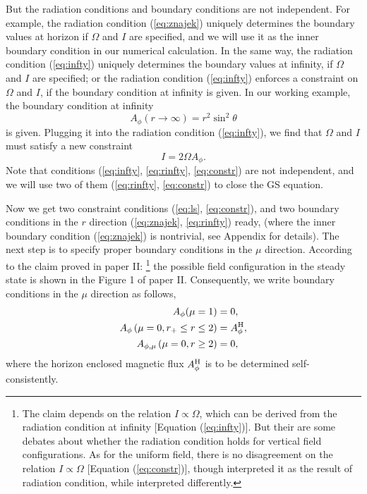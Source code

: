 \documentclass[iop,apj]{emulateapj}
\def\sst{\sin^2\theta}
\def\Am{A_{\phi,\mu}}
\def\be{\begin{equation}}
\def\ee{\end{equation}}
\def\AB{A_\phi^{\rm H}}
\begin{document}
But the radiation conditions and boundary conditions are not independent.
For example, the radiation condition (\ref{eq:znajek}) uniquely determines the boundary values at horizon
if $\Omega$ and $I$ are specified, and we will use it as the inner boundary condition in our numerical calculation.
In the same way, the radiation condition (\ref{eq:infty})
uniquely determines the boundary values at infinity, if $\Omega$ and $I$ are specified;
or the radiation condition (\ref{eq:infty}) enforces a constraint on $\Omega$ and $I$,
if the boundary condition at infinity is given.
In our working example, the boundary condition at infinity
\be
\label{eq:rinfty}
A_\phi(r\rightarrow\infty) = r^2\sst
\ee
is given. Plugging it into the radiation condition (\ref{eq:infty}), we find
that $\Omega$ and $I$ must satisfy a new constraint \citep{Nathanail2014, Pan2014, Pan2016}
\be
\label{eq:constr}
I = 2\Omega A_\phi.
\ee
Note that conditions (\ref{eq:infty}, \ref{eq:rinfty}, \ref{eq:constr}) are not independent,
and we will use two of them (\ref{eq:rinfty}, \ref{eq:constr}) to close the GS equation.


Now we get two constraint conditions (\ref{eq:ls}, \ref{eq:constr}),
and two boundary conditions in the $r$ direction  (\ref{eq:znajek}, \ref{eq:rinfty}) ready,
(where the inner boundary condition (\ref{eq:znajek}) is nontrivial, see Appendix for details).
The next step is to specify proper boundary conditions in the $\mu$ direction.
According to the claim proved in paper II:
\footnote{The claim depends on the relation $I\propto \Omega$,
which can be derived from the radiation condition at infinity [Equation (\ref{eq:infty})]. But their are some debates about
whether the radiation condition holds for vertical field configurations.
As for the uniform field,
there is no disagreement on the relation $I\propto \Omega$ [Equation (\ref{eq:constr})],
though \citet{Pan2016} interpreted it as the result of radiation condition,
while \citet{Nathanail2014} interpreted differently.}
\noindent the possible field configuration in the steady state is shown in the Figure 1 of paper II.
Consequently, we write  boundary conditions in
the $\mu$ direction as follows,
\be
\label{eq:tbc}
\begin{aligned}
A_\phi(\mu = 1) & = 0 , \\
A_\phi\left(\mu = 0, r_+\leq r\leq 2\right) &= \AB ,\\
\Am\left(\mu = 0, r\geq 2\right) &= 0 ,
\end{aligned}
\ee
where the horizon enclosed magnetic flux $\AB$ is to be determined self-consistently.
\end{document}
